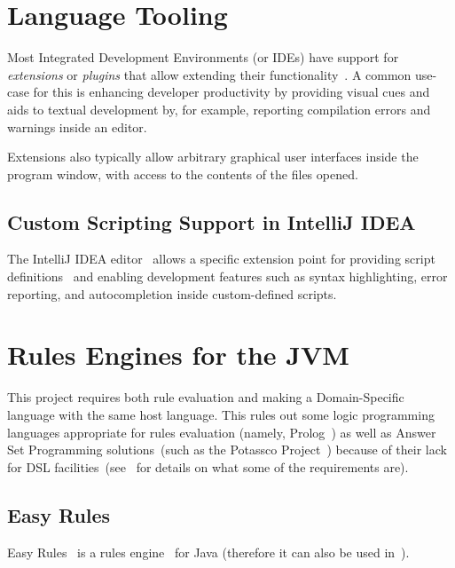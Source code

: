 \section{Language Tooling}\label{sec:language-tooling}

Most Integrated Development Environments (or IDEs) have support for \emph{extensions} or \emph{plugins} that allow extending their functionality~\cite{ideaExtensionPoints, vscodeExtensions}.
A common use-case for this is enhancing developer productivity by providing visual cues and aids to textual development by, for example, reporting compilation errors and warnings inside an editor.

Extensions also typically allow arbitrary graphical user interfaces inside the program window, with access to the contents of the files opened.

\subsection{Custom Scripting Support in IntelliJ IDEA}\label{subsec:scripting-in-intellij}

The IntelliJ IDEA editor~\cite{intelliJRepo} allows a specific extension point for providing script definitions~\cite{kotlinScriptKeep, ideaExtensionPoints} and enabling development features such as syntax highlighting, error reporting, and autocompletion inside custom-defined scripts.


\section{Rules Engines for the JVM}\label{sec:rules-engines}

This project requires both rule evaluation and making a Domain-Specific language with the same host language.
This rules out some logic programming languages appropriate for rules evaluation (namely, Prolog~\cite{prologBirth1988}) as well as Answer Set Programming solutions~(such as the Potassco Project~\cite{potassco}) because of their lack for DSL facilities~(see~ for details on what some of the requirements are).

\subsection{Easy Rules}\label{subsec:j-easy-rules}

Easy Rules~\cite{easyRules} is a rules engine~\cite{fowlerRulesEngine} for Java (therefore it can also be used in~).

